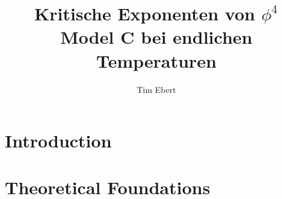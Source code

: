 \documentclass[12pt,twoside]{report}
\author{Tim Ebert}
\title{Kritische Exponenten von $\phi^4$ Model C bei endlichen Temperaturen}
\begin{document}

\newpage
\tableofcontents
\chapter{Introduction}

\chapter{Theoretical Foundations}

\begin{appendices}
\end{appendices}
\printbibliography[heading=bibintoc, title={Complete bibliography}]
\clearpage
\newpage
%
\end{document}
